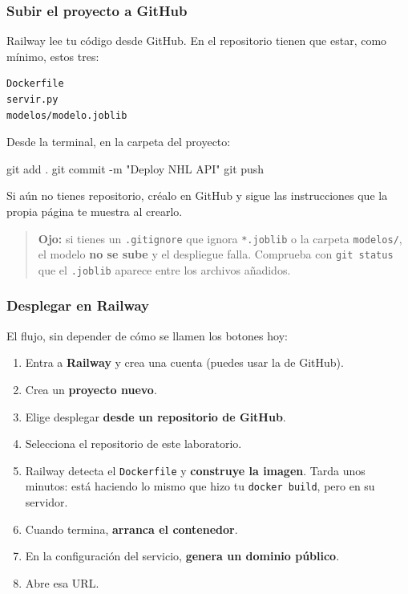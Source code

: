 \documentclass[
]{article}
\newenvironment{Shaded}{}{}
\newcommand{\AttributeTok}[1]{\textcolor[rgb]{0.49,0.56,0.16}{#1}}
\newcommand{\FunctionTok}[1]{\textcolor[rgb]{0.02,0.16,0.49}{#1}}
\newcommand{\NormalTok}[1]{#1}
\newcommand{\StringTok}[1]{\textcolor[rgb]{0.25,0.44,0.63}{#1}}
\providecommand{\tightlist}{%
  \setlength{\itemsep}{0pt}\setlength{\parskip}{0pt}}
\begin{document}
\protect{}\label{Y0lyk4Q9nYyf}
\subsubsection{Subir el proyecto a
GitHub}\label{subir-el-proyecto-a-github}

Railway lee tu código desde GitHub. En el repositorio tienen que estar,
como mínimo, estos tres:

\begin{verbatim}
Dockerfile
servir.py
modelos/modelo.joblib
\end{verbatim}

Desde la terminal, en la carpeta del proyecto:

\begin{Shaded}
\begin{Highlighting}[]
\FunctionTok{git}\NormalTok{ add .}
\FunctionTok{git}\NormalTok{ commit }\AttributeTok{{-}m} \StringTok{"Deploy NHL API"}
\FunctionTok{git}\NormalTok{ push}
\end{Highlighting}
\end{Shaded}

Si aún no tienes repositorio, créalo en GitHub y sigue las instrucciones
que la propia página te muestra al crearlo.

\begin{quote}
\textbf{Ojo:} si tienes un \texttt{.gitignore} que ignora
\texttt{*.joblib} o la carpeta \texttt{modelos/}, el modelo \textbf{no
se sube} y el despliegue falla. Comprueba con \texttt{git\ status} que
el \texttt{.joblib} aparece entre los archivos añadidos.
\end{quote}

\protect{}\label{6fh9nPP1nYyf}
\subsubsection{Desplegar en Railway}\label{desplegar-en-railway}

El flujo, sin depender de cómo se llamen los botones hoy:

\begin{enumerate}
\tightlist
\item
  Entra a \textbf{Railway} y crea una cuenta (puedes usar la de GitHub).
\item
  Crea un \textbf{proyecto nuevo}.
\item
  Elige desplegar \textbf{desde un repositorio de GitHub}.
\item
  Selecciona el repositorio de este laboratorio.
\item
  Railway detecta el \texttt{Dockerfile} y \textbf{construye la imagen}.
  Tarda unos minutos: está haciendo lo mismo que hizo tu
  \texttt{docker\ build}, pero en su servidor.
\item
  Cuando termina, \textbf{arranca el contenedor}.
\item
  En la configuración del servicio, \textbf{genera un dominio público}.
\item
  Abre esa URL.
\end{enumerate}
\end{document}
